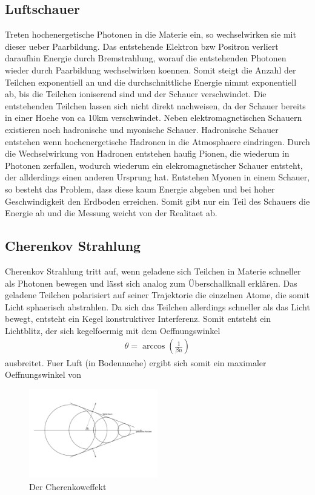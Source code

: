 \subsection{Luftschauer}
Treten hochenergetische Photonen in die Materie ein, so wechselwirken sie mit dieser ueber Paarbildung. Das entstehende Elektron bzw Positron verliert daraufhin Energie durch Bremstrahlung, worauf die entstehenden Photonen wieder durch Paarbildung wechselwirken koennen. Somit steigt die Anzahl der Teilchen exponentiell an und die durchschnittliche Energie nimmt exponentiell ab, bis die Teilchen ioniserend sind und der Schauer verschwindet. Die entstehenden Teilchen lassen sich nicht direkt nachweisen, da der Schauer bereits in einer Hoehe von ca 10km verschwindet. %
Neben elektromagnetischen Schauern existieren noch hadronische und myonische Schauer. Hadronische Schauer entstehen wenn hochenergetische Hadronen in die Atmosphaere eindringen. Durch die Wechselwirkung von Hadronen entstehen haufig Pionen, die wiederum in Photonen zerfallen, wodurch wiederum ein elekromagnetischer Schauer entsteht, der allderdings einen anderen Ursprung hat. Entstehen Myonen in einem Schauer, so besteht das Problem, dass diese kaum Energie abgeben und bei hoher Geschwindigkeit den Erdboden erreichen. Somit gibt nur ein Teil des Schauers die Energie ab und die Messung weicht von der Realitaet ab.

\subsection{Cherenkov Strahlung}
Cherenkov Strahlung tritt auf, wenn geladene sich Teilchen in Materie schneller als Photonen bewegen und lässt sich analog zum Überschallknall erklären. Das geladene Teilchen polarisiert auf seiner Trajektorie die einzelnen Atome, die somit Licht sphaerisch abstrahlen. Da sich das Teilchen allerdings schneller als das Licht bewegt, entsteht ein Kegel konstruktiver Interferenz. Somit entsteht ein Lichtblitz, der sich kegelfoermig mit dem Oeffnungswinkel %
\begin{align}
\theta = \arccos\left(\frac{1}{\beta n}\right)
\end{align}
ausbreitet. Fuer Luft (in Bodennaehe) ergibt sich somit ein maximaler Oeffnungswinkel von
\begin{figure}[htbp]
\centering
\includegraphics[width=0.5\textwidth]{Images/cherenkow.png}
\caption{Der Cherenkoweffekt}
\label{img:cherenkow}
\end{figure}

